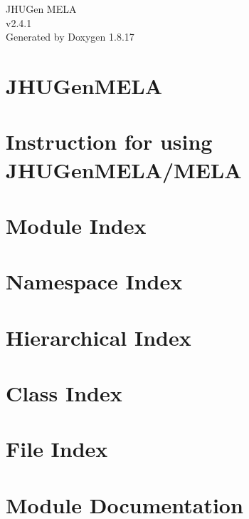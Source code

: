 \let\mypdfximage\pdfximage\def\pdfximage{\immediate\mypdfximage}\documentclass[twoside]{book}
\newcommand{\+}{\discretionary{\mbox{\scriptsize$\hookleftarrow$}}{}{}}
\newcommand{\clearemptydoublepage}{%
  \newpage{\pagestyle{empty}\cleardoublepage}%
}
\begin{document}
\hypersetup{pageanchor=false,
             bookmarksnumbered=true,
             pdfencoding=unicode
            }
\begin{titlepage}
\vspace*{7cm}
\begin{center}%
{\Large J\+H\+U\+Gen M\+E\+LA \\[1ex]\large v2.\+4.\+1 }\\
\vspace*{1cm}
{\large Generated by Doxygen 1.8.17}\\
\end{center}
\end{titlepage}
\clearemptydoublepage
{}
\tableofcontents
\clearemptydoublepage
{}
\hypersetup{pageanchor=true}

\chapter{J\+H\+U\+Gen\+M\+E\+LA}
\label{index}\hypertarget{index}{}
\chapter{Instruction for using J\+H\+U\+Gen\+M\+E\+L\+A/\+M\+E\+LA}
\label{md_MELA_README}

\chapter{Module Index}

\chapter{Namespace Index}

\chapter{Hierarchical Index}

\chapter{Class Index}

\chapter{File Index}

\chapter{Module Documentation}

\end{document}
